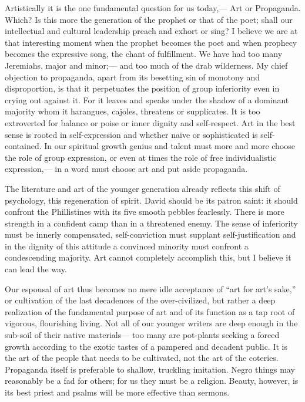 \documentclass[12pt]{article}
\begin{document}
Artistically it is the one fundamental question for us today,--- Art or Propaganda. Which? Is this more the generation of the prophet or that of the poet; shall our intellectual and cultural leadership preach and exhort or sing? I believe we are at that interesting moment when the prophet becomes the poet and when prophecy becomes the expressive song, the chant of fulfillment. We have had too many Jeremiahs, major and minor;--- and too much of the drab wilderness. My chief objection to propaganda, apart from its besetting sin of monotony and disproportion, is that it perpetuates the position of group inferiority even in crying out against it. For it leaves and speaks under the shadow of a dominant majority whom it harangues, cajoles, threatens or supplicates. It is too extroverted for balance or poise or inner dignity and self-respect. Art in the best sense is rooted in self-expression and whether naive or sophisticated is self-contained. In our spiritual growth genius and talent must more and more choose the role of group expression, or even at times the role of free individualistic expression,--- in a word must choose art and put aside propaganda.

The literature and art of the younger generation already reflects this shift of psychology, this regeneration of spirit. David should be its patron saint: it should confront the Phillistines with its five smooth pebbles fearlessly. There is more strength in a confident camp than in a threatened enemy. The sense of inferiority must be innerly compensated, self-conviction must supplant self-justification and in the dignity of this attitude a convinced minority must confront a condescending majority. Art cannot completely accomplish this, but I believe it can lead the way.

Our espousal of art thus becomes no mere idle acceptance of “art for art's sake,” or cultivation of the last decadences of the over-civilized, but rather a deep realization of the fundamental purpose of art and of its function as a tap root of vigorous, flourishing living. Not all of our younger writers are deep enough in the sub-soil of their native materials--- too many are pot-plants seeking a forced growth according to the exotic tastes of a pampered and decadent public. It is the art of the people that needs to be cultivated, not the art of the coteries. Propaganda itself is preferable to shallow, truckling imitation. Negro things may reasonably be a fad for others; for us they must be a religion. Beauty, however, is its best priest and psalms will be more effective than sermons.
\end{document}
